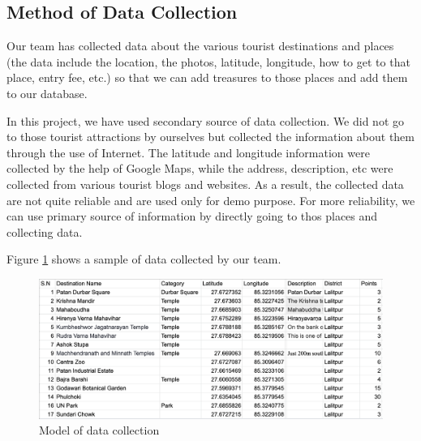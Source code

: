 \documentclass[12pt, a4paper, oneside]{article}
\begin{document}
\subsection{Method of Data Collection}
Our team has collected data about the various tourist destinations and places (the data include the location, the photos, latitude, longitude, how to get to that place, entry fee, etc.) so that we can add treasures to those places and add them to our database.

In this project, we have used secondary source of data collection. We did not go to those tourist attractions by ourselves but collected the information about them through the use of Internet. The latitude and longitude information were collected by the help of Google Maps, while the address, description, etc were collected from various tourist blogs and websites. As a result, the collected data are not quite reliable and are used only for demo purpose. For more reliability, we can use primary source of information by directly going to thos places and collecting data.

Figure \ref{fig:data-model} shows a sample of data collected by our team.

\begin{figure}[H]
\includegraphics[width=\linewidth, keepaspectratio]{screenshots/data-collection.png}
\centering
\caption{Model of data collection}
\label{fig:data-model}
\end{figure}
\end{document}
